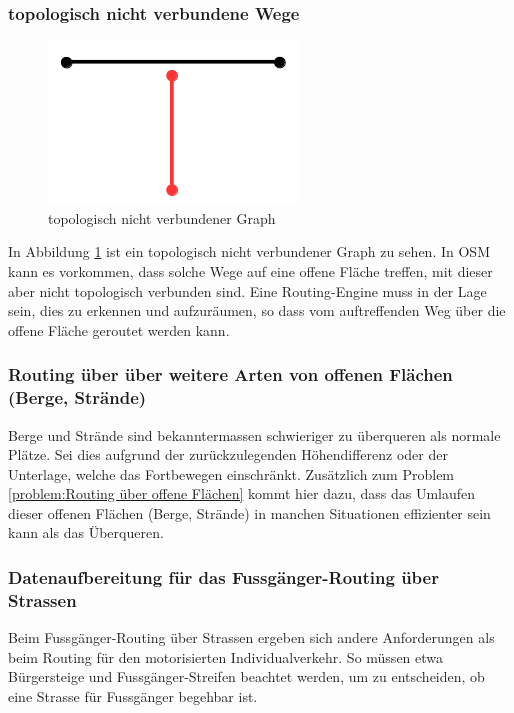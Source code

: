\subsubsection{topologisch nicht verbundene Wege}
\label{problem:topologisch nicht verbundene Wege}

\begin{figure}[ht]
\centering
\includegraphics[width=0.5\linewidth]{technicalreport/img/topologisch_nicht_verbundener_graph}
\caption[topologisch nicht verbundener Graph]{topologisch nicht verbundener Graph}
\label{fig:topologisch_nicht_verbundener_graph}
\end{figure}

In Abbildung \ref{fig:topologisch_nicht_verbundener_graph} ist ein topologisch nicht verbundener Graph zu sehen. In \ac{OSM} kann es vorkommen, dass solche Wege auf eine offene Fläche treffen, mit dieser aber nicht topologisch verbunden sind. Eine \gls{Routing-Engine} muss in der Lage sein, dies zu erkennen und aufzuräumen, so dass vom auftreffenden Weg über die offene Fläche geroutet werden kann.

\subsubsection{Routing über über weitere Arten von offenen Flächen (Berge, Strände)}
\label{problem:Routing über über weitere Arten von offenen Flächen (Berge, Strände)}
Berge und Strände sind bekanntermassen schwieriger zu überqueren als normale Plätze. Sei dies aufgrund der zurückzulegenden Höhendifferenz oder der Unterlage, welche das Fortbewegen einschränkt. Zusätzlich zum Problem \ref{problem:Routing über offene Flächen} kommt hier dazu, dass das Umlaufen dieser offenen Flächen (Berge, Strände) in manchen Situationen effizienter sein kann als das Überqueren.

\subsubsection{Datenaufbereitung für das Fussgänger-Routing über Strassen}
\label{problem:Datenaufbereitung für das Fussgänger-Routing über Strassen}
Beim Fussgänger-Routing über Strassen ergeben sich andere Anforderungen als beim Routing für den motorisierten Individualverkehr. So müssen etwa Bürgersteige und Fussgänger-Streifen beachtet werden, um zu entscheiden, ob eine Strasse für Fussgänger begehbar ist.

